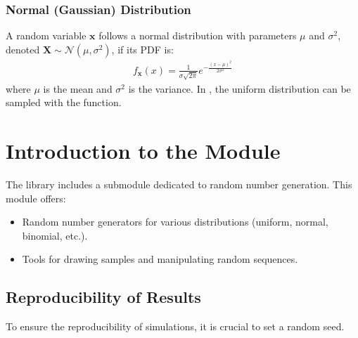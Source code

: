 \documentclass[letterpaper,10pt,english]{jupyterBook}
\begin{document}
\subsubsection{Normal (Gaussian) Distribution}
\label{\detokenize{01:normal-gaussian-distribution}}
\sphinxAtStartPar
A random variable \(\mathbf x\) follows a normal distribution with parameters \(\mu\) and \(\sigma^2\), denoted \(\mathbf X \sim \mathcal{N}(\mu, \sigma^2)\), if its PDF is:
\begin{equation*}
\begin{split}
    f_{\mathbf x}(x) = \frac{1}{\sigma\sqrt{2\pi}} e^{-\frac{(x-\mu)^2}{2\sigma^2}}
\end{split}
\end{equation*}
\sphinxAtStartPar
where \(\mu\) is the mean and \(\sigma^2\) is the variance.
In , the uniform distribution can be sampled with the  function.


\section{Introduction to the  Module}
\label{\detokenize{01:introduction-to-the-numpy-random-module}}
\sphinxAtStartPar
The  library includes a  submodule dedicated to random number generation. This module offers:
\begin{itemize}
\item {} 
\sphinxAtStartPar
Random number generators for various distributions (uniform, normal, binomial, etc.).

\item {} 
\sphinxAtStartPar
Tools for drawing samples and manipulating random sequences.

\end{itemize}


\subsection{Reproducibility of Results}
\label{\detokenize{01:reproducibility-of-results}}
\sphinxAtStartPar
To ensure the reproducibility of simulations, it is crucial to set a random seed.
\end{document}
